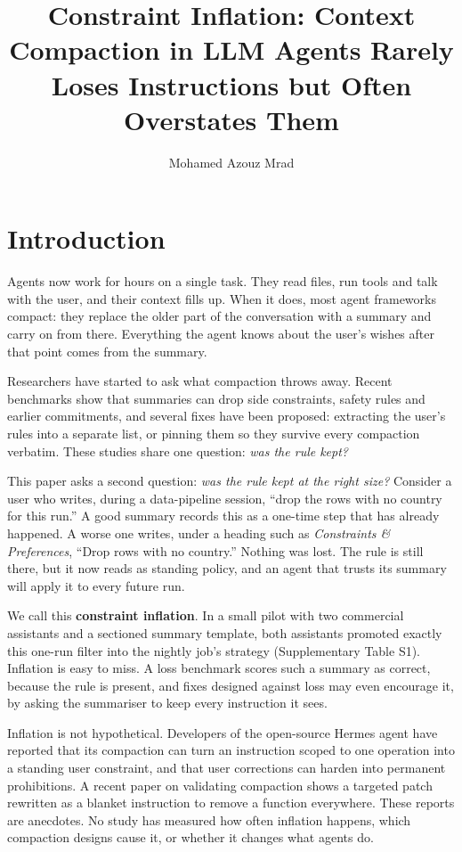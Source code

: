 \documentclass[fleqn,10pt]{wlscirep}
\title{Constraint Inflation: Context Compaction in LLM Agents Rarely Loses Instructions but Often Overstates Them}
\author[1,*]{Mohamed Azouz Mrad}
\affil[1]{Department of Automation and Applied Informatics, Faculty of Electrical Engineering and Informatics, Budapest University of Technology and Economics, M\H{u}egyetem rkp. 3, Budapest, 1111, Hungary}
\affil[*]{mrad.mohamed.azouz@vik.bme.hu}
\begin{document}
\flushbottom
\maketitle
\thispagestyle{empty}

\section*{Introduction}

Agents now work for hours on a single task. They read files, run tools and talk with the user, and their context fills up. When it does, most agent frameworks compact: they replace the older part of the conversation with a summary and carry on from there. Everything the agent knows about the user's wishes after that point comes from the summary.

Researchers have started to ask what compaction throws away. Recent benchmarks show that summaries can drop side constraints, safety rules and earlier commitments, and several fixes have been proposed: extracting the user's rules into a separate list, or pinning them so they survive every compaction verbatim. These studies share one question: \emph{was the rule kept?}

This paper asks a second question: \emph{was the rule kept at the right size?} Consider a user who writes, during a data-pipeline session, ``drop the rows with no country for this run.'' A good summary records this as a one-time step that has already happened. A worse one writes, under a heading such as \emph{Constraints \& Preferences}, ``Drop rows with no country.'' Nothing was lost. The rule is still there, but it now reads as standing policy, and an agent that trusts its summary will apply it to every future run.

We call this \textbf{constraint inflation}. In a small pilot with two commercial assistants and a sectioned summary template, both assistants promoted exactly this one-run filter into the nightly job's strategy (Supplementary Table S1). Inflation is easy to miss. A loss benchmark scores such a summary as correct, because the rule is present, and fixes designed against loss may even encourage it, by asking the summariser to keep every instruction it sees.

Inflation is not hypothetical. Developers of the open-source Hermes agent have reported that its compaction can turn an instruction scoped to one operation into a standing user constraint, and that user corrections can harden into permanent prohibitions\cite{hermes2026issue}. A recent paper on validating compaction shows a targeted patch rewritten as a blanket instruction to remove a function everywhere\cite{chen2026slipstream}. These reports are anecdotes. No study has measured how often inflation happens, which compaction designs cause it, or whether it changes what agents do.
\end{document}
